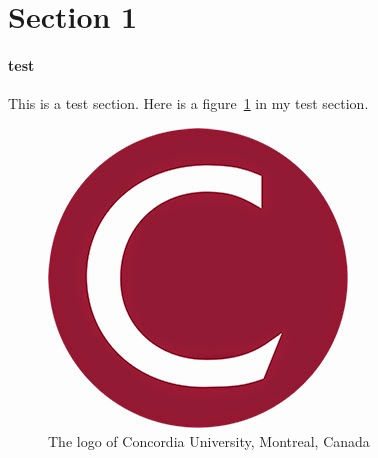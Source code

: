 \section{Section 1}
\paragraph{test}


This is a test section. Here is a figure~\ref{fig:concordia} in my test section.

\begin{figure}[h]
\centering

\includegraphics[width=0.7\linewidth]{"fig/concordia"}
\caption{The logo of Concordia University, Montreal, Canada}
\label{fig:concordia}
\end{figure}
